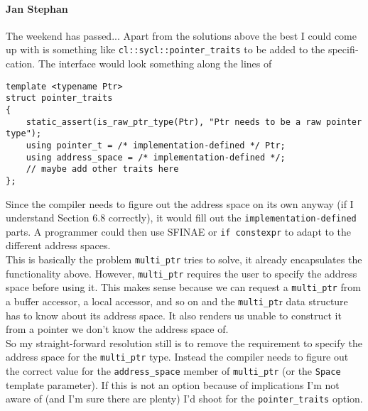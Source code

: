 \begin{otherlanguage}{english}
    \paragraph{Jan Stephan} The weekend has passed... Apart from the solutions
                            above the best I could come up with is something
                            like \texttt{cl::sycl::pointer\_traits} to be added
                            to the specification. The interface would look
                            something along the lines of
                            \begin{code}
                                \begin{verbatim}
template <typename Ptr>
struct pointer_traits
{
    static_assert(is_raw_ptr_type(Ptr), "Ptr needs to be a raw pointer type");
    using pointer_t = /* implementation-defined */ Ptr;
    using address_space = /* implementation-defined */;
    // maybe add other traits here
};
                                \end{verbatim}
                            \end{code}
                            Since the compiler needs to figure out the address
                            space on its own anyway (if I understand Section 6.8
                            correctly), it would fill out the
                            \texttt{implementation-defined} parts. A programmer
                            could then use SFINAE or \texttt{if constexpr} to
                            adapt to the different address spaces.
                            \\
                            This is basically the problem \texttt{multi\_ptr}
                            tries to solve, it already encapsulates the
                            functionality above. However, \texttt{multi\_ptr}
                            requires the user to specify the address space
                            before using it. This makes sense because we can
                            request a \texttt{multi\_ptr} from a buffer
                            accessor, a local accessor, and so on and the
                            \texttt{multi\_pt}r data structure has to know about
                            its address space. It also renders us unable to
                            construct it from a pointer we don't know the
                            address space of.
                            \\
                            So my straight-forward resolution still is to remove
                            the requirement to specify the address space for the
                            \texttt{multi\_ptr} type. Instead the compiler needs
                            to figure out the correct value for the
                            \texttt{address\_space} member of
                            \texttt{multi\_ptr} (or the \texttt{Space} template
                            parameter). If this is not an option because of
                            implications I'm not aware of (and I'm sure there
                            are plenty) I'd shoot for the
                            \texttt{pointer\_traits} option.

\end{otherlanguage}
